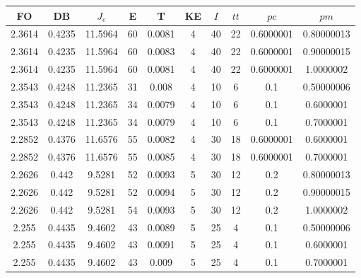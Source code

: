 \begin{table}[h!]
    \footnotesize
    \begin{center}
        \begin{tabular}{|c|c|c|c|c|c|c|c|c|c|}
        \hline
            {\bf FO} & {\bf DB} & $J_e$ & {\bf E} & {\bf T} & {\bf KE} & $I$ & $tt$ & $pc$ & $pm$ \\
        \hline
        \hline
            2.3614 & 0.4235  & 11.5964 & 60 & 0.0081 & 4 & 40 & 22 & 0.6000001 & 0.80000013\\
        \hline
        \hline
            2.3614 & 0.4235  & 11.5964 & 60 & 0.0083 & 4 & 40 & 22 & 0.6000001 & 0.90000015\\
        \hline
        \hline
            2.3614 & 0.4235  & 11.5964 & 60 & 0.0081 & 4 & 40 & 22 & 0.6000001 & 1.0000002\\
        \hline
        \hline
            2.3543 & 0.4248  & 11.2365 & 31 & 0.008 & 4 & 10 & 6 & 0.1 & 0.50000006\\
        \hline
        \hline
            2.3543 & 0.4248  & 11.2365 & 34 & 0.0079 & 4 & 10 & 6 & 0.1 & 0.6000001\\
        \hline
        \hline
            2.3543 & 0.4248  & 11.2365 & 34 & 0.0079 & 4 & 10 & 6 & 0.1 & 0.7000001\\
        \hline
        \hline
            2.2852 & 0.4376  & 11.6576 & 55 & 0.0082 & 4 & 30 & 18 & 0.6000001 & 0.6000001\\
        \hline
        \hline
            2.2852 & 0.4376  & 11.6576 & 55 & 0.0085 & 4 & 30 & 18 & 0.6000001 & 0.7000001\\
        \hline
        \hline
            2.2626 & 0.442  & 9.5281 & 52 & 0.0093 & 5 & 30 & 12 & 0.2 & 0.80000013\\
        \hline
        \hline
            2.2626 & 0.442  & 9.5281 & 52 & 0.0094 & 5 & 30 & 12 & 0.2 & 0.90000015\\
        \hline
        \hline
            2.2626 & 0.442  & 9.5281 & 54 & 0.0093 & 5 & 30 & 12 & 0.2 & 1.0000002\\
        \hline
        \hline
            2.255 & 0.4435  & 9.4602 & 43 & 0.0089 & 5 & 25 & 4 & 0.1 & 0.50000006\\
        \hline
        \hline
            2.255 & 0.4435  & 9.4602 & 43 & 0.0091 & 5 & 25 & 4 & 0.1 & 0.6000001\\
        \hline
        \hline
            2.255 & 0.4435  & 9.4602 & 43 & 0.009 & 5 & 25 & 4 & 0.1 & 0.7000001\\
        \hline

\end{tabular}
\end{center}
\end{table}
